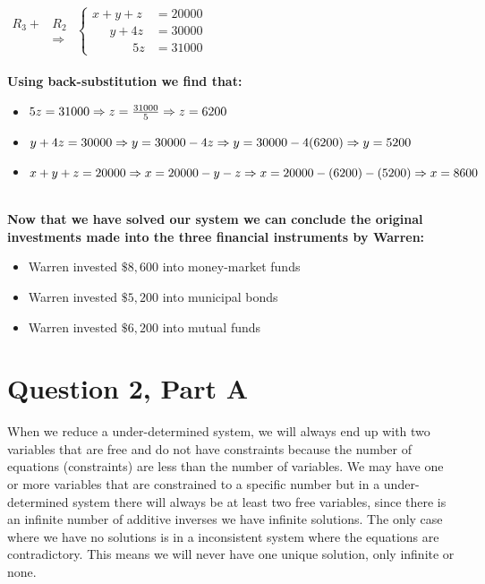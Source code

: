 \documentclass{article}
\begin{document}
$
\begin{aligned} 
R_3 +& R_2\\
&\Rightarrow
\end{aligned}
$
\;
$
\begin{cases} 
    
    x+y+z &= 20000\\
    \;\;\;\;\;y+4z &= 30000\\
    \;\;\;\;\;\;\;\;\;\;\,\;5z &= 31000  
    
\end{cases}
$\\\\
\textbf{Using back-substitution we find that:}


\begin{itemize}
    
        \item $5z=31000\\ \Rightarrow z=\frac{31000}{5}\\ \Rightarrow z=6200$\\
        \item $y+4z=30000\\ \Rightarrow y=30000-4z\\ \Rightarrow y=30000-4(6200)\\ \Rightarrow y = 5200$\\
        \item $x+y+z=20000\\ \Rightarrow x=20000-y-z\\ \Rightarrow x=20000-(6200)-(5200)\\ \Rightarrow x=8600$\\\\
\end{itemize}
\textbf{Now that we have solved our system we can conclude the original investments made into the three financial instruments by Warren:}
\begin{itemize}
    \item Warren invested $\$8,600$ into money-market funds
    \item Warren invested $\$5,200$ into municipal bonds
    \item Warren invested $\$6,200$ into mutual funds
\end{itemize}

\newpage
\section*{Question 2, Part A}
When we reduce a under-determined system, we will always end up with two variables that are free and do not have constraints because the number of equations (constraints) are less than the number of variables. We may have one or more variables that are constrained to a specific number but in a under-determined system there will always be at least two free variables, since there is an infinite number of additive inverses we have infinite solutions. The only case where we have no solutions is in a inconsistent system where the equations are contradictory. This means we will never have one unique solution, only infinite or none. 
\end{document}
